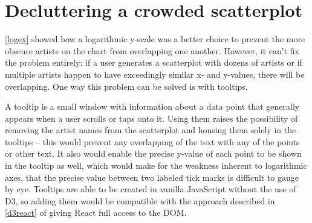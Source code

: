 \section{Decluttering a crowded scatterplot}\label{declutter}

\autoref{logex} showed how a logarithmic y-scale was a better choice to prevent the more obscure artists on the chart from overlapping one another. However, it can't fix the problem entirely: if a user generates a scatterplot with dozens of artists or if multiple artists happen to have exceedingly similar x- and y-values, there will be overlapping. One way this problem can be solved is with tooltips.

A tooltip is a small window with information about a data point that generally appears when a user scrolls or taps onto it. Using them raises the possibility of removing the artist names from the scatterplot and housing them solely in the tooltips -- this would prevent any overlapping of the text with any of the points or other text. It also would enable the precise y-value of each point to be shown in the tooltip as well, which would make for the weakness inherent to logarithmic axes, that the precise value between two labeled tick marks is difficult to gauge by eye. Tooltips are able to be created in vanilla JavaScript without the use of D3, so adding them would be compatible with the approach described in \autoref{d3react} of giving React full access to the DOM.